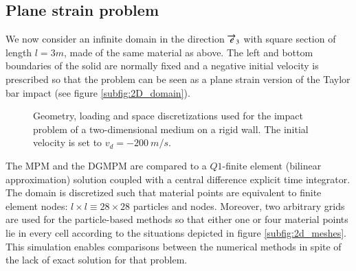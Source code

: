 
\subsection{Plane strain problem}
\label{sec:plane-strain-problem}
We now consider an infinite domain in the direction ${\overrightarrow{e}}_3$ with square section of length $l=3m$, made of the same material as above.
The left and bottom boundaries of the solid are normally fixed and a negative initial velocity is prescribed so that the problem can be seen as a plane strain version of the Taylor bar impact (see figure \ref{subfig:2D_domain}).
\begin{figure}[ht]
  \centering
   \qquad
  \caption{Geometry, loading and space discretizations used for the impact problem of a two-dimensional medium on a rigid wall. The initial velocity is set to $v_d=-200 \: m/s$.}
  \label{fig:PS_domain}
\end{figure}


The MPM and the DGMPM are compared to a $Q1$-finite element (bilinear approximation) solution coupled with a central difference explicit time integrator.
The domain is discretized such that material points are equivalent to finite element nodes: $l\times l \equiv 28 \times 28$ particles and nodes.
Moreover, two arbitrary grids are used for the particle-based methods so that either one or four material points lie in every cell according to the situations depicted in figure \ref{subfig:2d_meshes}.
This simulation enables comparisons between the numerical methods in spite of the lack of exact solution for that problem.


